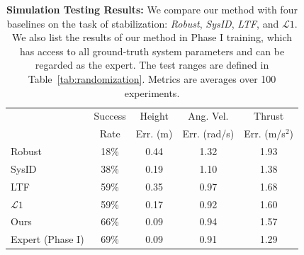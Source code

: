 \begin{table}[h]
\caption{\label{tab:sim-metrics} \textbf{Simulation Testing Results:} We compare our method with four baselines on the task of stabilization: \emph{Robust}, \emph{SysID}, \emph{LTF}, and $\mathcal{L}1$. We also list the results of our method in Phase I training, which has access to all ground-truth system parameters and can be regarded as the expert. The test ranges are defined in Table~\ref{tab:randomization}.
Metrics are averages over 100 experiments.
}
\centering
\begin{tabular*}{0.45\textwidth}{@{}lcccc@{}}
\toprule
   & Success & Height  & Ang. Vel. &  Thrust \\ &Rate& Err. (m) &Err. (rad/s)  & Err. (m/s$^2$) \\%
\midrule
 Robust~\cite{peng2018sim,tobin2017domain} & 18\%& 0.44 & 1.32 & 1.93 \\ 
 SysID~\cite{SysID} & 38\%& 0.19 & 1.10 & 1.38\\
 LTF~\cite{LTF} & 59\% & 0.35 & 0.97 & 1.68 \\
 $\mathcal{L}1$~\cite{hanover2021performance} & 59\% & 0.17 & 0.92 & 1.60 \\
 Ours & 66\% & 0.09 & 0.94 & 1.57 \\
 \midrule
 Expert (Phase I) & 69\% & 0.09 & 0.91 & 1.29 \\
\bottomrule
\end{tabular*}

\end{table}

